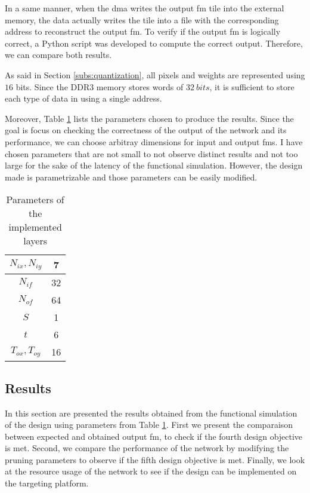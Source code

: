 In a same manner, when the \acrshort{dma} writes the output \acrshort{fm} tile into the external memory, the data actually writes the tile into a file with the corresponding address to reconstruct the output \acrshort{fm}. To verify if the output \acrshort{fm} is logically correct, a Python script was developed to compute the correct output. Therefore, we can compare both results.

As said in Section \ref{subs:quantization}, all pixels and weights are represented using $16$ bits. Since the DDR3 memory stores words of $32 \ bits$, it is sufficient to store each type of data in using a single address.

Moreover, Table \ref{tab:param} lists the parameters chosen to produce the results. Since the goal is focus on checking the correctness of the output of the network and its performance, we can choose arbitray dimensions for input and output \acrshort{fm}s. I have chosen parameters that are not small to not observe distinct results and not too large for the sake of the latency of the functional simulation. However, the design made is parametrizable and those parameters can be easily modified.
%
\begin{table}
    \centering
    \begin{tabular}{|c|c|}
    \hline
    $N_{ix}, N_{iy}$ & 7 \\
    \hline
    $N_{if} $ & 32 \\
    \hline
    $N_{of}$ & 64 \\
    \hline
    $S$ & 1\\
    \hline
    $t$ & 6 \\
    \hline
    $T_{ox}, T_{oy}$ & 16 \\
    \hline
    \end{tabular}
    \caption{Parameters of the implemented layers}
    \label{tab:param}
\end{table}
%
\subsection{Results} \label{subs:res}
In this section are presented the results obtained from the functional simulation of the design using parameters from Table \ref{tab:param}. First we present the comparaison between expected and obtained output \acrshort{fm}, to check if the fourth design objective is met. Second, we compare the performance of the network by modifying the pruning parameters to observe if the fifth design objective is met. Finally, we look at the resource usage of the network to see if the design can be implemented on the targeting platform.
%
